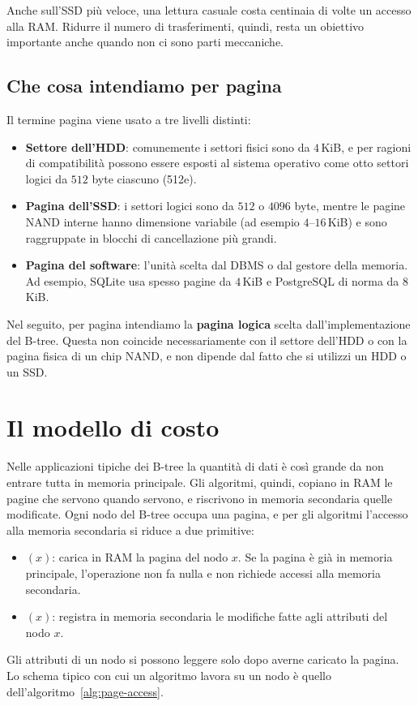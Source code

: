 Anche sull'SSD più veloce, una lettura casuale costa centinaia di volte un accesso alla RAM. Ridurre il numero di trasferimenti, quindi, resta un obiettivo importante anche quando non ci sono parti meccaniche.

\subsection{Che cosa intendiamo per pagina}
Il termine pagina viene usato a tre livelli distinti:
\begin{itemize}
    \item \textbf{Settore dell'HDD}: comunemente i settori fisici sono da $4$\,KiB, e per ragioni di compatibilità possono essere esposti al sistema operativo come otto settori logici da $512$ byte ciascuno (512e).
    \item \textbf{Pagina dell'SSD}: i settori logici sono da $512$ o $4096$ byte, mentre le pagine NAND interne hanno dimensione variabile (ad esempio $4$--$16$\,KiB) e sono raggruppate in blocchi di cancellazione più grandi.
    \item \textbf{Pagina del software}: l'unità scelta dal DBMS o dal gestore della memoria. Ad esempio, SQLite usa spesso pagine da $4$\,KiB e PostgreSQL di norma da $8$\,KiB.
\end{itemize}
Nel seguito, per pagina intendiamo la \textbf{pagina logica} scelta dall'implementazione del B-tree. Questa non coincide necessariamente con il settore dell'HDD o con la pagina fisica di un chip NAND, e non dipende dal fatto che si utilizzi un HDD o un SSD.

\section{Il modello di costo}\label{sec:btree-costo}
Nelle applicazioni tipiche dei B-tree la quantità di dati è così grande da non entrare tutta in memoria principale. Gli algoritmi, quindi, copiano in RAM le pagine che servono quando servono, e riscrivono in memoria secondaria quelle modificate. Ogni nodo del B-tree occupa una pagina, e per gli algoritmi l'accesso alla memoria secondaria si riduce a due primitive:
\begin{itemize}
    \item \PageRead$(x)$: carica in RAM la pagina del nodo $x$. Se la pagina è già in memoria principale, l'operazione non fa nulla e non richiede accessi alla memoria secondaria.
    \item \PageWrite$(x)$: registra in memoria secondaria le modifiche fatte agli attributi del nodo $x$.
\end{itemize}
Gli attributi di un nodo si possono leggere solo dopo averne caricato la pagina. Lo schema tipico con cui un algoritmo lavora su un nodo è quello dell'algoritmo~\ref{alg:page-access}.

